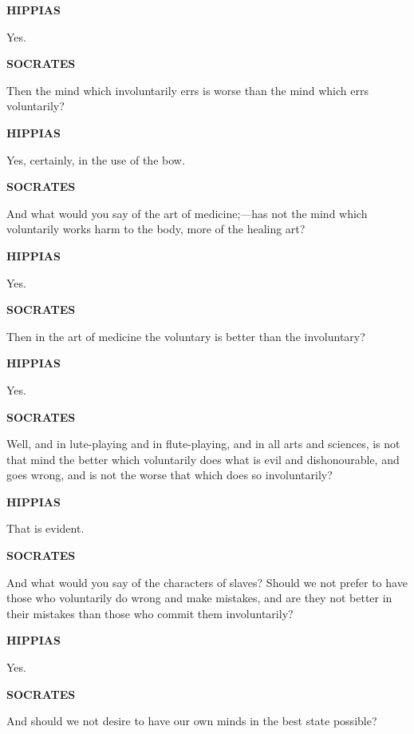 \documentclass[11pt,letter]{article}
\begin{document}
\par \textbf{HIPPIAS}
\par   Yes.

\par \textbf{SOCRATES}
\par   Then the mind which involuntarily errs is worse than the mind which errs voluntarily?

\par \textbf{HIPPIAS}
\par   Yes, certainly, in the use of the bow.

\par \textbf{SOCRATES}
\par   And what would you say of the art of medicine;—has not the mind which voluntarily works harm to the body, more of the healing art?

\par \textbf{HIPPIAS}
\par   Yes.

\par \textbf{SOCRATES}
\par   Then in the art of medicine the voluntary is better than the involuntary?

\par \textbf{HIPPIAS}
\par   Yes.

\par \textbf{SOCRATES}
\par   Well, and in lute-playing and in flute-playing, and in all arts and sciences, is not that mind the better which voluntarily does what is evil and dishonourable, and goes wrong, and is not the worse that which does so involuntarily?

\par \textbf{HIPPIAS}
\par   That is evident.

\par \textbf{SOCRATES}
\par   And what would you say of the characters of slaves? Should we not prefer to have those who voluntarily do wrong and make mistakes, and are they not better in their mistakes than those who commit them involuntarily?

\par \textbf{HIPPIAS}
\par   Yes.

\par \textbf{SOCRATES}
\par   And should we not desire to have our own minds in the best state possible?
\end{document}
